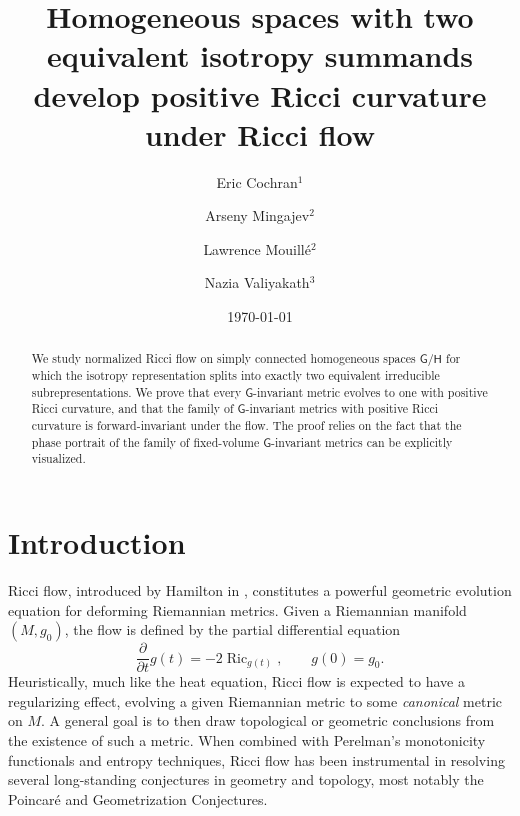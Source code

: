 \documentclass{amsart}
\title[$\gG/\gH$ with two isotropy summands develops $\Ric>0$ under Ricci flow]{Homogeneous spaces with two equivalent isotropy summands develop positive Ricci curvature under Ricci flow}
\author[E. Cochran]{Eric Cochran$^1$}
\author[A. Mingajev]{Arseny Mingajev$^{2}$}
\author[L. Mouillé]{Lawrence Mouillé$^2$}
\author[N. Valiyakath]{Nazia Valiyakath$^3$}
\date{\today}
\numberwithin{equation}{section}
\theoremstyle{plain}
\theoremstyle{definition}
\theoremstyle{remark}
\numberwithin{table}{section}
\DeclareMathOperator{\Ric}{Ric}
\newcommand{\gG}{\mathsf{G}}
\newcommand{\gH}{\mathsf{H}}
\begin{document}
\begin{abstract}
    We study normalized Ricci flow on simply connected homogeneous spaces $\gG/\gH$ for which the isotropy representation splits into exactly two equivalent irreducible subrepresentations.
    We prove that every $\gG$-invariant metric evolves to one with positive Ricci curvature, and that the family of $\gG$-invariant metrics with positive Ricci curvature is forward-invariant under the flow. 
    The proof relies on the fact that the phase portrait of the family of fixed-volume $\gG$-invariant metrics can be explicitly visualized. 
\end{abstract}

\maketitle

\section{Introduction}


Ricci flow, introduced by Hamilton in \cite{Hamilton82}, constitutes a powerful geometric evolution equation for deforming Riemannian metrics. 
Given a Riemannian manifold $(M,g_0)$, the flow is defined by the partial differential equation
\[
    \frac{\partial}{\partial t} g(t) = -2 \Ric_{g(t)}, \qquad g(0) = g_0.
\]
Heuristically, much like the heat equation, Ricci flow is expected to have a regularizing effect, evolving a given Riemannian metric to some \textit{canonical} metric on $M$.  
A general goal is to then draw topological or geometric conclusions from the existence of such a metric.
When combined with Perelman’s monotonicity functionals and entropy techniques, Ricci flow has been instrumental in resolving several long-standing conjectures in geometry and topology, most notably the Poincaré and Geometrization Conjectures.
\end{document}
